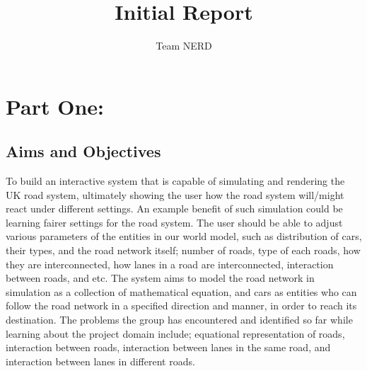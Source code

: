 \documentclass[a4paper,11pt]{article}
\begin{document}
\title{\textbf{Initial Report}}
\author{Team NERD}
\maketitle

\section[short]{Part One:}
\subsection{Aims and Objectives}%
To build an interactive system that is capable of simulating and rendering the UK road system, ultimately showing the user how the road system will/might react under different settings. An example benefit of such simulation could be learning fairer settings for the road system. The user should be able to adjust various parameters of the entities in our world model, such as distribution of cars, their types, and the road network itself; number of roads, type of each roads, how they are interconnected, how lanes in a road are interconnected, interaction between roads, and etc. The system aims to model the road network in simulation as a collection of mathematical equation, and cars as entities who can follow the road network in a specified direction and manner, in order to reach its destination.
The problems the group has encountered and identified so far while learning about the project domain include; equational representation of roads, interaction between roads, interaction between lanes in the same road, and interaction between lanes in different roads.
\end{document}
